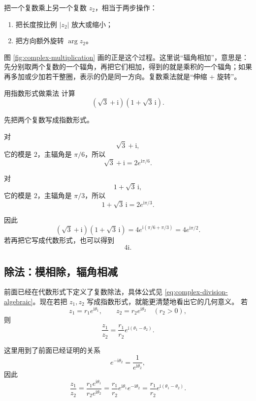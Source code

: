 \begin{tishi}[复数乘法的几何意义]
把一个复数乘上另一个复数 $z_2$，相当于两步操作：
\begin{enumerate}
    \item 把长度按比例 $|z_2|$ 放大或缩小；
    \item 把方向额外旋转 $\arg z_2$。
\end{enumerate}
图 \ref{fig:complex-multiplication} 画的正是这个过程。这里说``辐角相加''，意思是：先分别取两个复数的一个辐角，再把它们相加，得到的就是乘积的一个辐角；如果再多加或少加若干整圈，表示的仍是同一方向。复数乘法就是``伸缩 + 旋转''。
\end{tishi}

\begin{lizi}{用指数形式做乘法}{}
计算
\[
(\sqrt{3}+\mathrm{i})(1+\sqrt{3}\,\mathrm{i}).
\]

\begin{jie}
先把两个复数写成指数形式。

对
\[
\sqrt{3}+\mathrm{i},
\]
它的模是 $2$，主辐角是 $\pi/6$，所以
\[
\sqrt{3}+\mathrm{i}=2e^{\mathrm{i}\pi/6}.
\]

对
\[
1+\sqrt{3}\,\mathrm{i},
\]
它的模是 $2$，主辐角是 $\pi/3$，所以
\[
1+\sqrt{3}\,\mathrm{i}=2e^{\mathrm{i}\pi/3}.
\]

因此
\[
(\sqrt{3}+\mathrm{i})(1+\sqrt{3}\,\mathrm{i})
=4e^{\mathrm{i}(\pi/6+\pi/3)}
=4e^{\mathrm{i}\pi/2}.
\]
若再把它写成代数形式，也可以得到
\[
4\mathrm{i}.
\]
\end{jie}
\end{lizi}

\subsection{除法：模相除，辐角相减}

前面已经在代数形式下定义了复数除法，具体公式见 \eqref{eq:complex-division-algebraic}。现在若把 $z_1,z_2$ 写成指数形式，就能更清楚地看出它的几何意义。
若
\[
z_1=r_1e^{\mathrm{i}\theta_1},\qquad z_2=r_2e^{\mathrm{i}\theta_2}\quad (r_2>0),
\]
则
\begin{equation}\label{eq:complex-division-polar}
    \frac{z_1}{z_2}=\frac{r_1}{r_2}e^{\mathrm{i}(\theta_1-\theta_2)}.
\end{equation}

这里用到了前面已经证明的关系
\[
e^{-\mathrm{i}\theta_2}=\frac{1}{e^{\mathrm{i}\theta_2}},
\]
因此
\[
\frac{z_1}{z_2}
=\frac{r_1e^{\mathrm{i}\theta_1}}{r_2e^{\mathrm{i}\theta_2}}
=\frac{r_1}{r_2}e^{\mathrm{i}\theta_1}e^{-\mathrm{i}\theta_2}
=\frac{r_1}{r_2}e^{\mathrm{i}(\theta_1-\theta_2)}.
\]

